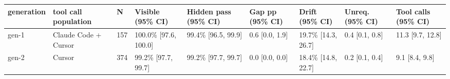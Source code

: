 \begin{tabular}{lllllllll}
\toprule
generation & tool call population & N & Visible (95\% CI) & Hidden pass (95\% CI) & Gap pp (95\% CI) & Drift (95\% CI) & Unreq. (95\% CI) & Tool calls (95\% CI) \\
\midrule
gen-1 & Claude Code + Cursor & 157 & 100.0\% [97.6, 100.0] & 99.4\% [96.5, 99.9] & 0.6 [0.0, 1.9] & 19.7\% [14.3, 26.7] & 0.4 [0.1, 0.8] & 11.3 [9.7, 12.8] \\
gen-2 & Cursor & 374 & 99.2\% [97.7, 99.7] & 99.2\% [97.7, 99.7] & 0.0 [0.0, 0.0] & 18.4\% [14.8, 22.7] & 0.2 [0.1, 0.4] & 9.1 [8.4, 9.8] \\
\bottomrule
\end{tabular}
